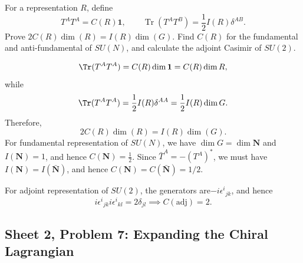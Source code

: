 For a representation $R$, define
\begin{equation}
    T^AT^A=C(R)\mathbf1,
    \qquad
    \operatorname{Tr}(T^AT^B)=\frac12I(R)\delta^{AB}.
\end{equation}
Prove $2C(R)\dim(R)=I(R)\dim(G)$.
Find $C(R)$ for the fundamental and anti-fundamental of $SU(N)$,
and calculate the adjoint Casimir of $SU(2)$.
\begin{solution}
    \begin{equation}
        \Tr(T^A T^A) = C(R) \dim \mathbf{1} = C(R)\dim R,
    \end{equation}
    while
    \begin{equation}
        \Tr(T^AT^A) = \frac{1}{2}I(R) \delta^{AA} = \frac{1}{2}I(R) \dim G.
    \end{equation}
    Therefore,
    \begin{equation}
        2C(R)\dim(R)=I(R)\dim(G).
    \end{equation}
    For fundamental representation of $SU(N)$, we have $\dim G = \dim \mathbf{N}$ and $I(\mathbf{N}) =1$, and hence $C(\mathbf{N})  = \frac{1}{2}$. Since $\bar T^A = - (T^A)^*$, we must have $I(\mathbf{N}) = I(\bar{\mathbf{N}})$, and hence $C(\mathbf{N}) = C(\bar{\mathbf{N}}) = 1/2$.

    For adjoint representation of $SU(2)$, the generators are$-i\epsilon^i{}_{jk}$, and hence
    \begin{equation}
        i\epsilon^i{}_{jk}i\epsilon^i{}_{kl} =2\delta_{jl} \implies C(\mathrm{adj}) = 2.
    \end{equation}
\end{solution}

\subsection{Sheet 2, Problem 7: Expanding the Chiral Lagrangian}

